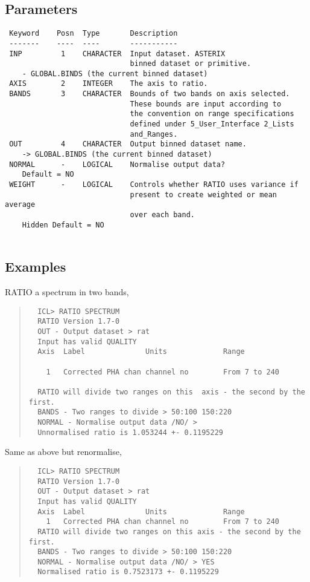 \documentclass{book}
\renewcommand{\_}{{\tt\char'137}}     %
\begin{document}
\subsection{Parameters}
\begin{verbatim}
 Keyword    Posn  Type       Description
 -------    ----  ----       -----------
 INP         1    CHARACTER  Input dataset. ASTERIX
                             binned dataset or primitive.
    - GLOBAL.BINDS (the current binned dataset)
 AXIS        2    INTEGER    The axis to ratio.
 BANDS       3    CHARACTER  Bounds of two bands on axis selected.
                             These bounds are input according to
                             the convention on range specifications
                             defined under 5_User_Interface 2_Lists
                             and_Ranges.
 OUT         4    CHARACTER  Output binned dataset name.
    -> GLOBAL.BINDS (the current binned dataset)
 NORMAL      -    LOGICAL    Normalise output data?
    Default = NO
 WEIGHT      -    LOGICAL    Controls whether RATIO uses variance if
                             present to create weighted or mean average
                             over each band.
    Hidden Default = NO
 
\end{verbatim}\subsection{Examples}
RATIO a spectrum in two bands,
 
\begin{quote}\begin{verbatim}
  ICL> RATIO SPECTRUM
  RATIO Version 1.7-0
  OUT - Output dataset > rat
  Input has valid QUALITY
  Axis  Label              Units             Range
 
    1   Corrected PHA chan channel no        From 7 to 240
 
  RATIO will divide two ranges on this  axis - the second by the first.
  BANDS - Two ranges to divide > 50:100 150:220
  NORMAL - Normalise output data /NO/ >
  Unnormalised ratio is 1.053244 +- 0.1195229
\end{verbatim}\end{quote}
Same as above but renormalise,
 
\begin{quote}\begin{verbatim}
  ICL> RATIO SPECTRUM
  RATIO Version 1.7-0
  OUT - Output dataset > rat
  Input has valid QUALITY
  Axis  Label              Units             Range
    1   Corrected PHA chan channel no        From 7 to 240
  RATIO will divide two ranges on this axis - the second by the first.
  BANDS - Two ranges to divide > 50:100 150:220
  NORMAL - Normalise output data /NO/ > YES
  Normalised ratio is 0.7523173 +- 0.1195229
\end{verbatim}\end{quote}
\end{document}
